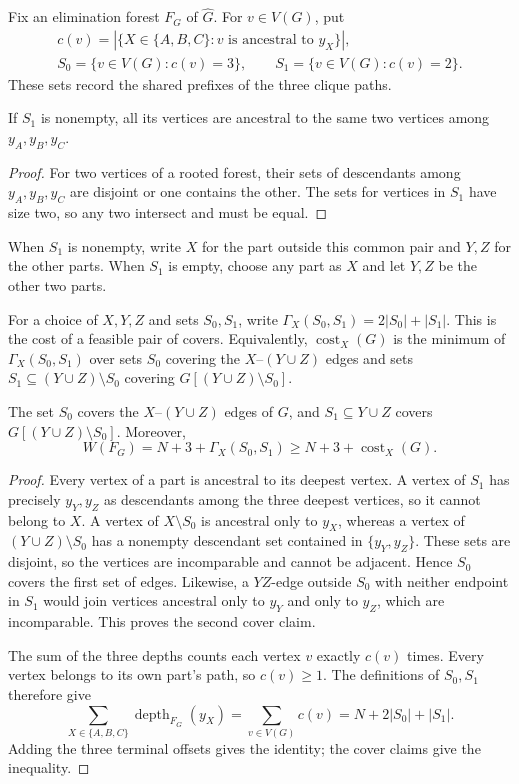 Fix an elimination forest $F_G$ of $\widehat G$. For $v\in V(G)$, put
\[
\begin{gathered}
c(v)=|\{X\in\{A,B,C\}:v\text{ is ancestral to }y_X\}|,\\S_0=\{v\in V(G):c(v)=3\},\qquad
 S_1=\{v\in V(G):c(v)=2\}.
\end{gathered}
\]
These sets record the shared prefixes of the three clique paths.

\begin{lemma}
\label{lem:clique-path-pair}
If $S_1$ is nonempty, all its vertices are ancestral to the same two
vertices among $y_A,y_B,y_C$.
\end{lemma}

\begin{proof}
For two vertices of a rooted forest, their sets of descendants among
$y_A,y_B,y_C$ are disjoint or one contains the other. The sets for
vertices in $S_1$ have size two, so any two intersect and must be equal.
\end{proof}

When $S_1$ is nonempty, write $X$ for the part outside this common
pair and $Y,Z$ for the other parts. When $S_1$ is empty, choose any
part as $X$ and let $Y,Z$ be the other two parts.

For a choice of $X,Y,Z$ and sets $S_0,S_1$, write
$\Gamma_X(S_0,S_1)=2|S_0|+|S_1|$.
This is the cost of a feasible pair of covers. Equivalently,
$\operatorname{cost}_X(G)$ is the minimum of $\Gamma_X(S_0,S_1)$
over sets $S_0$ covering the $X$--$(Y\cup Z)$ edges and sets
$S_1\subseteq(Y\cup Z)\setminus S_0$ covering
$G[(Y\cup Z)\setminus S_0]$.

\begin{lemma}
\label{lem:clique-path-covers}
The set $S_0$ covers the $X$--$(Y\cup Z)$ edges of $G$, and
$S_1\subseteq Y\cup Z$ covers $G[(Y\cup Z)\setminus S_0]$.
Moreover,
\[
 W(F_G)=N+3+\Gamma_X(S_0,S_1)
 \ge N+3+\operatorname{cost}_X(G).
\]
\end{lemma}

\begin{proof}
Every vertex of a part is ancestral to its deepest vertex. A vertex
of $S_1$ has precisely $y_Y,y_Z$ as descendants among the three
deepest vertices, so it cannot belong to $X$. A vertex of
$X\setminus S_0$ is ancestral only to $y_X$, whereas a vertex of
$(Y\cup Z)\setminus S_0$ has a nonempty descendant set contained in
$\{y_Y,y_Z\}$. These sets are disjoint, so the vertices are
incomparable and cannot be adjacent. Hence $S_0$ covers the first
set of edges. Likewise, a $YZ$-edge outside $S_0$ with neither
endpoint in $S_1$ would join vertices ancestral only to $y_Y$ and
only to $y_Z$, which are incomparable. This proves the second cover
claim.

The sum of the three depths counts each vertex $v$ exactly $c(v)$
times. Every vertex belongs to its own part's path, so $c(v)\geq1$.
The definitions of $S_0,S_1$ therefore give
\[
 \sum_{X\in\{A,B,C\}}\operatorname{depth}_{F_G}(y_X)
 =\sum_{v\in V(G)}c(v)=N+2|S_0|+|S_1|.
\]
Adding the three terminal offsets gives the identity; the cover
claims give the inequality.
\end{proof}

